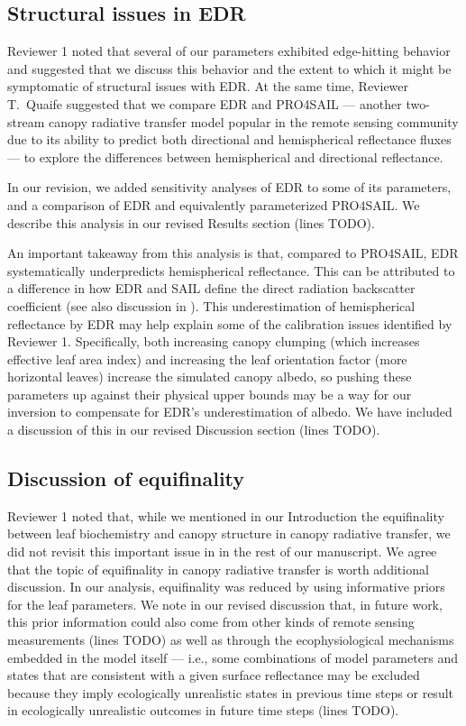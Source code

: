 \documentclass{article}
\begin{document}
\subsection{Structural issues in EDR}\label{subsec:structural}

Reviewer 1 noted that several of our parameters exhibited edge-hitting behavior and suggested that we discuss this behavior and the extent to which it might be symptomatic of structural issues with EDR.\@
At the same time, Reviewer T.\ Quaife suggested that we compare EDR and PRO4SAIL --- another two-stream canopy radiative transfer model popular in the remote sensing community due to its ability to predict both directional and hemispherical reflectance fluxes --- to explore the differences between hemispherical and directional reflectance.

In our revision, we added sensitivity analyses of EDR to some of its parameters, and a comparison of EDR and equivalently parameterized PRO4SAIL.\@
We describe this analysis in our revised Results section (lines TODO).

An important takeaway from this analysis is that, compared to PRO4SAIL, EDR systematically underpredicts hemispherical reflectance.
This can be attributed to a difference in how EDR and SAIL define the direct radiation backscatter coefficient (see also discussion in \citealt{yuan2017reexamination}).
This underestimation of hemispherical reflectance by EDR may help explain some of the calibration issues identified by Reviewer 1.
Specifically, both increasing canopy clumping (which increases effective leaf area index) and increasing the leaf orientation factor (more horizontal leaves) increase the simulated canopy albedo,
so pushing these parameters up against their physical upper bounds may be a way for our inversion to compensate for EDR's underestimation of albedo.
We have included a discussion of this in our revised Discussion section (lines TODO).

\subsection{Discussion of equifinality}\label{subsec:equifinality}

Reviewer 1 noted that, while we mentioned in our Introduction the equifinality between leaf biochemistry and canopy structure in canopy radiative transfer, we did not revisit this important issue in in the rest of our manuscript.
We agree that the topic of equifinality in canopy radiative transfer is worth additional discussion.
In our analysis, equifinality was reduced by using informative priors for the leaf parameters.
We note in our revised discussion that, in future work, this prior information could also come from other kinds of remote sensing measurements (lines TODO)
as well as through the ecophysiological mechanisms embedded in the model itself --- i.e., some combinations of model parameters and states that are consistent with a given surface reflectance may be excluded because they imply ecologically unrealistic states in previous time steps or result in ecologically unrealistic outcomes in future time steps (lines TODO).
\end{document}
